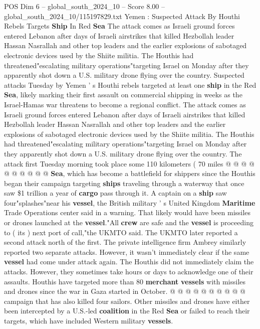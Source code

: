 \begin{textsample}{POS Dim 6 – global\_south\_2024\_10 – Score 8.00 – global\_south\_2024\_10/115197829.txt}  \label{ex:f6_pos_400}
Yemen : Suspected Attack By Houthi Rebels Targets \textbf{Ship} In Red \textbf{Sea} The attack comes as Israeli ground forces entered Lebanon after days of Israeli airstrikes that killed Hezbollah leader Hassan Nasrallah and other top leaders and the earlier explosions of sabotaged electronic devices used by the Shiite militia.
The Houthis had threatened"escalating military operations"targeting Israel on Monday after they apparently shot down a U.S. military drone flying over the country.
Suspected attacks Tuesday by Yemen ' s Houthi rebels targeted at least one \textbf{ship} in the Red \textbf{Sea}, likely marking their first assault on commercial shipping in weeks as the Israel-Hamas war threatens to become a regional conflict.
The attack comes as Israeli ground forces entered Lebanon after days of Israeli airstrikes that killed Hezbollah leader Hassan Nasrallah and other top leaders and the earlier explosions of sabotaged electronic devices used by the Shiite militia.
The Houthis had threatened"escalating military operations"targeting Israel on Monday after they apparently shot down a U.S. military drone flying over the country.
The attack first Tuesday morning took place some 110 kilometers ( 70 miles @ @ @ @ @ @ @ @ @ @ \textbf{Sea}, which has become a battlefield for shippers since the Houthis began their campaign targeting \textbf{ships} traveling through a waterway that once saw \$1 trillion a year of \textbf{cargo} pass through it.
A captain on a \textbf{ship} saw four"splashes"near his \textbf{vessel}, the British military ' s United Kingdom \textbf{Maritime} Trade Operations center said in a warning.
That likely would have been missiles or drones launched at the \textbf{vessel}."All \textbf{crew} are safe and the \textbf{vessel} is proceeding to ( its ) next port of call,"the UKMTO said.
The UKMTO later reported a second attack north of the first.
The private intelligence firm Ambrey similarly reported two separate attacks.
However, it wasn't immediately clear if the same \textbf{vessel} had come under attack again.
The Houthis did not immediately claim the attacks.
However, they sometimes take hours or days to acknowledge one of their assaults.
Houthis have targeted more than 80 \textbf{merchant} \textbf{vessels} with missiles and drones since the war in Gaza started in October. @ @ @ @ @ @ @ @ @ @ campaign that has also killed four sailors.
Other missiles and drones have either been intercepted by a U.S.-led \textbf{coalition} in the Red \textbf{Sea} or failed to reach their targets, which have included Western military \textbf{vessels}.

\end{textsample}
